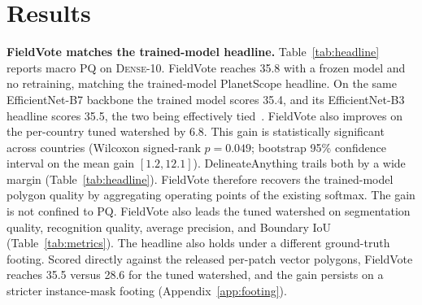 \documentclass[conference]{IEEEtran}
\newcommand{\parhead}[1]{\smallskip\noindent\textbf{#1}\hspace{0.6em}}
\begin{document}
\section{Results}
\label{sec:results}

\parhead{FieldVote matches the trained-model headline.}
Table~\ref{tab:headline} reports macro PQ on \textsc{Dense-10}. FieldVote reaches 35.8 with a frozen model and no retraining, matching the trained-model PlanetScope headline. On the same EfficientNet-B7 backbone the trained model scores 35.4, and its EfficientNet-B3 headline scores 35.5, the two being effectively tied~\cite{corley_ftp}. FieldVote also improves on the per-country tuned watershed by 6.8. This gain is statistically significant across countries (Wilcoxon signed-rank $p = 0.049$; bootstrap 95\% confidence interval on the mean gain $[1.2, 12.1]$). DelineateAnything trails both by a wide margin (Table~\ref{tab:headline}). FieldVote therefore recovers the trained-model polygon quality by aggregating operating points of the existing softmax. The gain is not confined to PQ. FieldVote also leads the tuned watershed on segmentation quality, recognition quality, average precision, and Boundary IoU~\cite{cheng2021boundaryiou} (Table~\ref{tab:metrics}). The headline also holds under a different ground-truth footing. Scored directly against the released per-patch vector polygons, FieldVote reaches 35.5 versus 28.6 for the tuned watershed, and the gain persists on a stricter instance-mask footing (Appendix~\ref{app:footing}).
\end{document}
